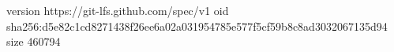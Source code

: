 version https://git-lfs.github.com/spec/v1
oid sha256:d5e82c1cd8271438f26ee6a02a031954785e577f5cf59b8c8ad3032067135d94
size 460794
